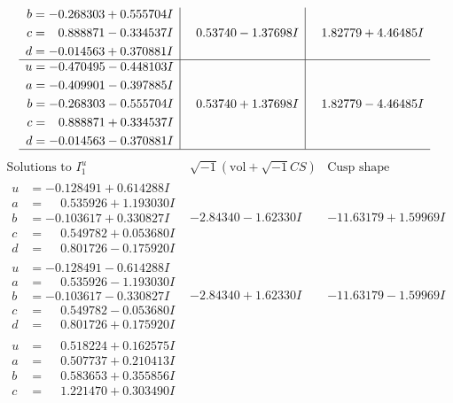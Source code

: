 \documentclass[1p]{elsarticle_modified}
\theoremstyle{definition}
\newcommand{\I}{\sqrt{-1}}
\begin{document}
$$\begin{array}{c|c|c}
\begin{aligned}
b &= -0.268303 + 0.555704 I \\
c &= \phantom{-}0.888871 - 0.334537 I \\
d &= -0.014563 + 0.370881 I\end{aligned}
 & \phantom{-}0.53740 - 1.37698 I & \phantom{-}1.82779 + 4.46485 I \\ \hline\begin{aligned}
u &= -0.470495 - 0.448103 I \\
a &= -0.409901 - 0.397885 I \\
b &= -0.268303 - 0.555704 I \\
c &= \phantom{-}0.888871 + 0.334537 I \\
d &= -0.014563 - 0.370881 I\end{aligned}
 & \phantom{-}0.53740 + 1.37698 I & \phantom{-}1.82779 - 4.46485 I\\
 \hline 
 \end{array}$$\newpage$$\begin{array}{c|c|c}  
\text{Solutions to }I^u_{1}& \I (\text{vol} + \sqrt{-1}CS) & \text{Cusp shape}\\
 \hline 
\begin{aligned}
u &= -0.128491 + 0.614288 I \\
a &= \phantom{-}0.535926 + 1.193030 I \\
b &= -0.103617 + 0.330827 I \\
c &= \phantom{-}0.549782 + 0.053680 I \\
d &= \phantom{-}0.801726 - 0.175920 I\end{aligned}
 & -2.84340 - 1.62330 I & -11.63179 + 1.59969 I \\ \hline\begin{aligned}
u &= -0.128491 - 0.614288 I \\
a &= \phantom{-}0.535926 - 1.193030 I \\
b &= -0.103617 - 0.330827 I \\
c &= \phantom{-}0.549782 - 0.053680 I \\
d &= \phantom{-}0.801726 + 0.175920 I\end{aligned}
 & -2.84340 + 1.62330 I & -11.63179 - 1.59969 I \\ \hline\begin{aligned}
u &= \phantom{-}0.518224 + 0.162575 I \\
a &= \phantom{-}0.507737 + 0.210413 I \\
b &= \phantom{-}0.583653 + 0.355856 I \\
c &= \phantom{-}1.221470 + 0.303490 I \\

\end{aligned}
\end{array}$$
\end{document}
